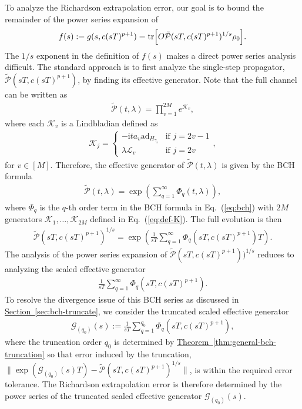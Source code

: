 \documentclass[11pt]{article}
\newcommand{\eq}[1]{(\ref{eq:#1})}
\newcommand{\thm}[1]{\hyperref[thm:#1]{Theorem~\ref*{thm:#1}}}
\renewcommand{\sec}[1]{\hyperref[sec:#1]{Section~\ref*{sec:#1}}}
\renewcommand{\i}{\mathrm{i}}
\newcommand{\ad}{\mathrm{ad}}
\newcommand{\G}{\mathcal{G}}
\newcommand{\mc}{\mathcal}
\begin{document}
To analyze the Richardson extrapolation error, our goal is to bound the remainder of the power series expansion of \begin{align*}
    f(s):= g(s, c(sT)^{p+1}) =  \tr[O\tilde{\mc P}(sT,c(sT)^{p+1})^{1/s}\rho_0].
\end{align*}
The $1/s$ exponent in the definition of $f(s)$ makes a direct power series analysis difficult. The standard approach is to first analyze the single-step propagator, $\tilde{\mc P}(sT,c(sT)^{p+1})$, by finding its effective generator. Note that the full channel can be written as \begin{align*}
    \tilde{\mc P}(t,\lambda) = \prod_{v=1}^{2M} e^{\mc K_{v}},
\end{align*} where each $\mc K_v$ is a Lindbladian defined as 
\begin{align}
 	\mathcal{K}_j= \begin{cases}-\i ta_{v}\ad_{H_{\gamma_v}} & \text{if } j = 2v-1\\ \lambda\mathcal{L}_v & \text{if } j = 2v \end{cases}, 	\label{eq:def-K}
\end{align}
for $v \in [M]$. Therefore, the effective generator of $\tilde{\mc P}(t,\lambda)$ is given by the BCH formula
\begin{align*}
    \tilde{\mc P}(t,\lambda)  = \exp\left(\sum_{q=1}^\infty \Phi_q(t,\lambda)\right),
\end{align*}
where $\Phi_q$ is the $q$-th order term in the BCH formula in Eq.~\eq{bch} with $2M$ generators $\mc K_1, \ldots, \mc K_{2M}$ defined in Eq.~\eq{def-K}.
The full evolution is then \begin{align*}
    \tilde{\mc P}(sT,c(sT)^{p+1})^{1/s} = \exp(\frac{1}{sT}\sum_{q=1}^\infty \Phi_q(sT,c(sT)^{p+1}) T). 
\end{align*}
The analysis of the power series expansion of $\tilde{\mc P}(sT,c(sT)^{p+1}))^{1/s}$ reduces to analyzing the scaled effective generator \begin{align*}
    \frac{1}{sT} \sum_{q=1}^\infty \Phi_q(sT,c(sT)^{p+1}).
\end{align*}
To resolve the divergence issue of this BCH series as discussed in \sec{bch-truncate}, we consider the truncated scaled effective generator \begin{align}
\label{eq:def-effect-generator}
    \G_{(q_0)}(s) := \frac{1}{sT} \sum_{q=1}^{q_0} \Phi_q(sT,c(sT)^{p+1}),
\end{align}
where the truncation order $q_0$ is determined by \thm{general-bch-truncation} so that error induced by the truncation, $\|\exp({\G_{(q_0)}(s)T})-\tilde{\mc P}(sT,c(sT)^{p+1})^{1/s}\|$, is within the required error tolerance.
The Richardson extrapolation error is therefore determined by the power series of the truncated scaled effective generator $\G_{(q_0)}(s)$.
\end{document}
